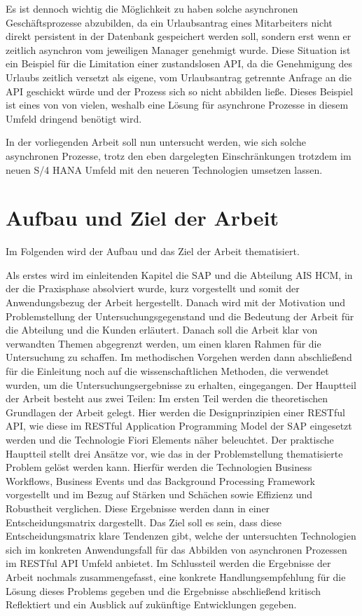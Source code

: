 Es ist dennoch wichtig die Möglichkeit zu haben solche asynchronen Geschäftsprozesse abzubilden, da \zB ein Urlaubsantrag eines Mitarbeiters nicht direkt persistent in der Datenbank gespeichert werden soll, sondern erst wenn er zeitlich asynchron vom jeweiligen Manager genehmigt wurde. Diese Situation ist ein Beispiel für die Limitation einer zustandslosen API, da die Genehmigung des Urlaubs zeitlich versetzt als eigene, vom Urlaubsantrag getrennte Anfrage an die API geschickt würde und der Prozess sich so nicht abbilden lie{\ss}e. Dieses Beispiel ist eines von von vielen, weshalb eine Lösung für asynchrone Prozesse in diesem Umfeld dringend benötigt wird.  

In der vorliegenden Arbeit soll nun untersucht werden, wie sich solche asynchronen Prozesse, trotz den eben dargelegten Einschränkungen trotzdem im neuen S/4 HANA Umfeld mit den neueren Technologien umsetzen lassen.

\section{Aufbau und Ziel der Arbeit}

Im Folgenden wird der Aufbau und das Ziel der Arbeit thematisiert.

Als erstes wird im einleitenden Kapitel die SAP und die Abteilung AIS HCM, in der die Praxisphase absolviert wurde, kurz vorgestellt und somit der Anwendungsbezug der Arbeit hergestellt. Danach wird mit der Motivation und Problemstellung der Untersuchungsgegenstand und die Bedeutung der Arbeit für die Abteilung und die Kunden erläutert. Danach soll die Arbeit klar von verwandten Themen abgegrenzt werden, um einen klaren Rahmen für die Untersuchung zu schaffen. Im methodischen Vorgehen werden dann abschlie{\ss}end für die Einleitung noch auf die wissenschaftlichen Methoden, die verwendet wurden, um die Untersuchungsergebnisse zu erhalten, eingegangen. Der Hauptteil der Arbeit besteht aus zwei Teilen: Im ersten Teil werden die theoretischen Grundlagen der Arbeit gelegt. Hier werden die Designprinzipien einer RESTful API, wie diese im RESTful Application Programming Model der SAP eingesetzt werden und die Technologie Fiori Elements näher beleuchtet. Der praktische Hauptteil stellt drei Ansätze vor, wie das in der Problemstellung thematisierte Problem gelöst werden kann. Hierfür werden die Technologien Business Workflows, Business Events und das Background Processing Framework vorgestellt und im Bezug auf Stärken und Schächen sowie Effizienz und Robustheit verglichen. Diese Ergebnisse werden dann in einer Entscheidungsmatrix dargestellt. Das Ziel soll es sein, dass diese Entscheidungsmatrix klare Tendenzen gibt, welche der untersuchten Technologien sich im konkreten Anwendungsfall für das Abbilden von asynchronen Prozessen im RESTful API Umfeld anbietet. Im Schlussteil werden die Ergebnisse der Arbeit nochmals zusammengefasst, eine konkrete Handlungsempfehlung für die Lösung dieses Problems gegeben und die Ergebnisse abschlie{\ss}end kritisch Reflektiert und ein Ausblick auf zukünftige Entwicklungen gegeben.

